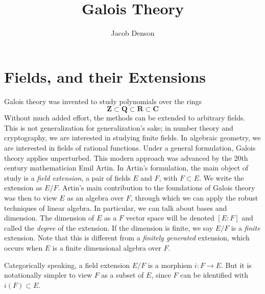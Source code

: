 

\title{Galois Theory}
\author{Jacob Denson}



\maketitle
\tableofcontents















\chapter{Fields, and their Extensions}

Galois theory was invented to study polynomials over the rings
%
\[ \mathbf{Z} \subset \mathbf{Q} \subset \mathbf{R} \subset \mathbf{C} \]
%
Without much added effort, the methods can be extended to arbitrary fields. This is not generalization for generalization's sake; in number theory and cryptography, we are interested in studying finite fields. In algebraic geometry, we are interested in fields of rational functions. Under a general formulation, Galois theory applies unperturbed. This modern approach was advanced by the 20th century mathematician Emil Artin. In Artin's formulation, the main object of study is a {\it field extension}, a pair of fields $E$ and $F$, with $F \subset E$. We write the extension as $E/F$. Artin's main contribution to the foundations of Galois theory was then to view $E$ as an algebra over $F$, through which we can apply the robust techniques of linear algebra. In particular, we can talk about bases and dimension. The dimension of $E$ as a $F$ vector space will be denoted $[E:F]$ and called the \emph{degree} of the extension. If the dimension is finite, we say $E/F$ is a {\it finite} extension. Note that this is different from a {\it finitely generated} extension, which occurs when $E$ is a finite dimensional algebra over $F$.

\begin{remark}
	Categorically speaking, a field extension $E/F$ is a morphism $i: F \to E$. But it is notationally simpler to view $F$ as a subset of $E$, since $F$ can be identified with $i(F) \subset E$.
\end{remark}

